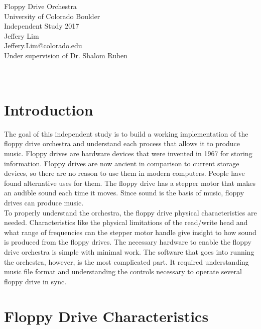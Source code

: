 \documentclass[11pt, a4paper]{report}
\begin{document}
\begin{center}
  \Huge Floppy Drive Orchestra \\
  \huge University of Colorado Boulder \\
  \Large Independent Study 2017\\
  
  \vspace{6in}
    \huge Jeffery Lim \\
    \huge Jeffery.Lim@colorado.edu\\
    \Large Under supervision of Dr. Shalom Ruben \\~\\~\\
\end{center}

\tableofcontents

\chapter{Introduction}

The goal of this independent study is to build a working implementation of the floppy drive orchestra and understand each process that allows it to produce music. Floppy drives are hardware devices that were invented in 1967 for storing information. Floppy drives are now ancient in comparison to current storage devices, so there are no reason to use them in modern computers. People have found alternative uses for them. The floppy drive has a stepper motor that makes an audible sound each time it moves. Since sound is the basis of music, floppy drives can produce music. \\

To properly understand the orchestra, the floppy drive physical characteristics are needed. Characteristics like the physical limitations of the read/write head and what range of frequencies can the stepper motor handle give insight to how sound is produced from the floppy drives. The necessary hardware to enable the floppy drive orchestra is simple with minimal work. The software that goes into running the orchestra, however, is the most complicated part. It required understanding music file format and understanding the controls necessary to operate several floppy drive in sync. \\


\chapter{Floppy Drive Characteristics}
\end{document}

